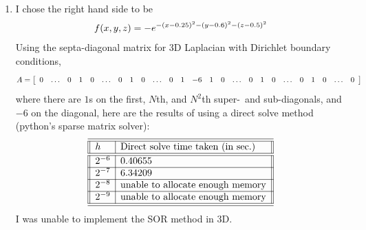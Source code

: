 \documentclass{article} %
\theoremstyle{plain}
\numberwithin{equation}{section} %
\numberwithin{figure}{section} %
\numberwithin{table}{section} %
\begin{document}
\begin{enumerate}[\ \ (a)]
    \item
        I chose the right hand side to be
        \begin{align}
            f(x,y,z) = -e^{-\qty(x-0.25)^2 - \qty(y - 0.6)^2 - \qty(z - 0.5)^2}
        \end{align}
        Using the septa-diagonal matrix for 3D Laplacian with Dirichlet boundary conditions,
        \begin{align}
            A = \qty[\begin{array}{ccccccccccccccccccccccccc}0 & \dots & 0 & 1 & 0 & \dots & 0 & 1 & 0 & \dots & 0  & 1 & -6 & 1 & 0 & \dots & 0 & 1 & 0 & \dots & 0 & 1 & 0 & \dots & 0\end{array}]
        \end{align}
        where there are $1$s on the first, $N$th, and $N^2$th super-~and sub-diagonals, and $-6$ on the diagonal, here are the results of using a direct solve method (python's sparse matrix solver):
        \begin{align*}
            \begin{array}{||l|l||}\hline\hline
                h & \text{Direct solve time taken (in sec.)} \\\hline\hline
                2^{-6} & 0.40655 \\\hline
                2^{-7} & 6.34209 \\\hline
                2^{-8} & \text{unable to allocate enough memory} \\\hline
                2^{-9} & \text{unable to allocate enough memory} \\\hline\hline
            \end{array}
        \end{align*}
        I was unable to implement the SOR method in 3D.
\end{enumerate}
\end{document}
